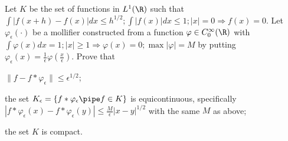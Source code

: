 Let $K$ be the set of functions in $L^1(\R)$ such that
$\int|f(x+h)-f(x)|dx\leq h^{1/2}; \int|f(x)|dx\leq 1; |x|=0\Rightarrow
f(x)=0$. Let $\varphi_{\epsilon}(\cdot )$ be a mollifier constructed
from a function $\varphi\in C_{0}^{\infty}(\R)$ with $\int
\varphi(x)dx=1; |x|\geq 1\Rightarrow \varphi(x)=0; \max |\varphi|=M$
by putting
$\varphi_{\epsilon}(x)=\frac{1}{\epsilon}\varphi(\frac{x}{\epsilon})$. Prove that 
\begin{alist}
\item $\|f-f \ast \varphi_{\epsilon}\|\leq \epsilon^{1/2}$; 
\item the set $K_{\epsilon}=\{f \ast \varphi_{\epsilon} \pipe  f\in K\}$ is
equicontinuous, specifically $|f \ast
\varphi_{\epsilon}(x)-f \ast
\varphi_{\epsilon}(y)|\leq \frac{M}{\epsilon}|x-y|^{1/2}$ with the same
$M$ as above;
\item the set $K$ is compact.
\end{alist}
